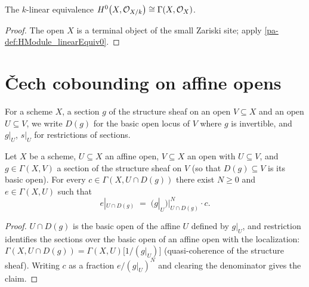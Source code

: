 \begin{definition}
  \label{pa-def:moduleKSheafHZero}
  \leanok

  The \(k\)-linear equivalence \(H^0\bigl(X, \mathcal{O}_{X/k}\bigr) \cong \Gamma(X, \mathcal{O}_{X})\).
\end{definition}
\begin{proof}
  \leanok
  The open \(X\) is a terminal object of the small Zariski site; apply
  \ref{pa-def:HModule_linearEquiv0}.
\end{proof}

\section{\v{C}ech cobounding on affine opens}

For a scheme \(X\), a section \(g\) of the structure sheaf on an open \(V \subseteq X\) and
an open \(U \subseteq V\), we write \(D(g)\) for the basic open locus of \(V\) where \(g\) is
invertible, and \(g|_U\), \(s|_U\) for restrictions of sections.

\begin{lemma}
  \label{pa-lem:denominator_clearing}
  \leanok

  Let \(X\) be a scheme, \(U \subseteq X\) an affine open, \(V \subseteq X\) an open with
  \(U \subseteq V\), and \(g \in \Gamma(X, V)\) a section of the structure sheaf on \(V\) (so
  that \(D(g) \subseteq V\) is its basic open). For every \(c \in \Gamma(X, U \cap D(g))\)
  there exist \(N \ge 0\) and \(e \in \Gamma(X, U)\) such that
  \[
    e|_{U \cap D(g)} \;=\; \bigl(g|_{U}\bigr)|_{U \cap D(g)}^{N} \cdot c .
  \]
\end{lemma}
\begin{proof}
  \leanok
  \(U \cap D(g)\) is the basic open of the affine \(U\) defined by \(g|_U\), and restriction
  identifies the sections over the basic open of an affine open with the localization:
  \(\Gamma(X, U \cap D(g)) = \Gamma(X, U)\bigl[1/(g|_U)\bigr]\) (quasi-coherence of the
  structure sheaf). Writing \(c\) as a fraction \(e / (g|_U)^N\) and clearing the denominator
  gives the claim.
\end{proof}

